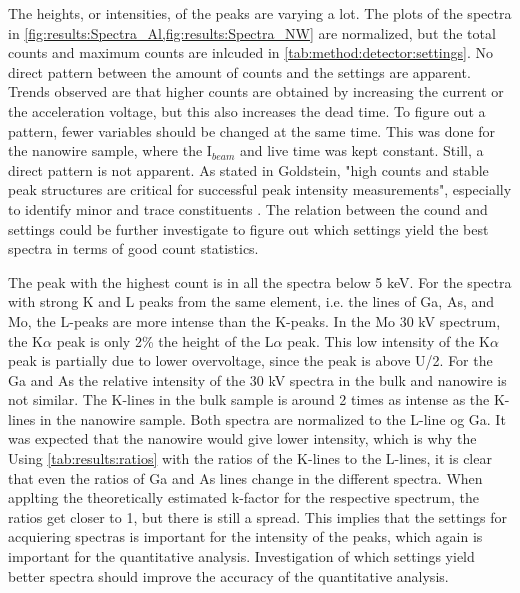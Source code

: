 The heights, or intensities, of the peaks are varying a lot.
The plots of the spectra in \cref{fig:results:Spectra_Al,fig:results:Spectra_NW} are normalized, but the total counts and maximum counts are inlcuded in \cref{tab:method:detector:settings}.
No direct pattern between the amount of counts and the settings are apparent.
Trends observed are that higher counts are obtained by increasing the current or the acceleration voltage, but this also increases the dead time.
To figure out a pattern, fewer variables should be changed at the same time.
This was done for the nanowire sample, where the I$_{beam}$ and live time was kept constant.
Still, a direct pattern is not apparent.
As stated in Goldstein, "high counts and stable peak structures are critical for successful peak intensity measurements", especially to identify minor and trace constituents \cite[page 318]{goldstein_scanning_2018}.
The relation between the cound and settings could be further investigate to figure out which settings yield the best spectra in terms of good count statistics.

The peak with the highest count is in all the spectra below 5 keV.
For the spectra with strong K and L peaks from the same element, i.e. the lines of Ga, As, and Mo, the L-peaks are more intense than the K-peaks.
In the Mo 30 kV spectrum, the K$\alpha$ peak is only 2\% the height of the L$\alpha$ peak.
This low intensity of the K$\alpha$ peak is partially due to lower overvoltage, since the peak is above U/2.
For the Ga and As the relative intensity of the 30 kV spectra in the bulk and nanowire is not similar.
The K-lines in the bulk sample is around 2 times as intense as the K-lines in the nanowire sample.
Both spectra are normalized to the L-line og Ga.
It was expected that the nanowire would give lower intensity, which is why the
Using \cref{tab:results:ratios} with the ratios of the K-lines to the L-lines, it is clear that even the ratios of Ga and As lines change in the different spectra.
When applting the theoretically estimated k-factor for the respective spectrum, the ratios get closer to 1, but there is still a spread.
This implies that the settings for acquiering spectras is important for the intensity of the peaks, which again is important for the quantitative analysis.
Investigation of which settings yield better spectra should improve the accuracy of the quantitative analysis.


